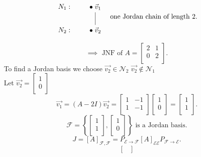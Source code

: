 \documentclass{report}
\begin{document}
{       \[
\begin{tikzpicture}[baseline=(current bounding box.center)]
  \node (n1) at (0,0)  {$N_1:$};
  \node (v1) at (1.6,0) {$\bullet\;\vec{v}_1$};
  \node (n2) at (0,-1.2) {$N_2:$};
  \node (v2) at (1.6,-1.2) {$\bullet\;\vec{v}_2$};
  \draw (v1) -- (v2);
\end{tikzpicture}
\quad
\text{one Jordan chain of length }2.
\]

    \[
    \implies \text{ JNF of } A = \begin{bmatrix}
    2 & 1\\
    0 & 2\\
    \end{bmatrix}
    .\] 
    To find a Jordan basis we choose $ \vec{ v_2} \in \mathcal{N} _2$  $ \vec{ v_2} \notin \mathcal{N}_1$ \\
    Let $ \vec{ v_2} = \begin{bmatrix}
    1\\
    0\\
    \end{bmatrix}
    $
    \[
    \vec{ v_1} = \left( A -2 I \right) \vec{ v_2} = \begin{bmatrix}
    1 & -1\\
    1 & -1\\
    \end{bmatrix}  \begin{bmatrix}
    1\\
    0\\
    \end{bmatrix}
    = \begin{bmatrix}
    1\\
    1\\
    \end{bmatrix}
    .\]
    \[
    \mathcal{F} = \left\{ \begin{bmatrix}
    1\\
    1\\
    \end{bmatrix}
    , \begin{bmatrix}
    1\\
    0\\
    \end{bmatrix}
\right\} \text{ is a Jordan basis}
    .\] 
    \[
	    J = \left[ A \right] _{ \mathcal{F}, \mathcal{F}} = P _{ \mathcal{E} \to \mathcal{F}} \left[ A \right] _{ \mathcal{E} \mathcal{E}} P _{ \mathcal{F} \to \mathcal{E}} 
    .\] 
    \[
    \begin{bmatrix}

\end{bmatrix}\]}
\end{document}
